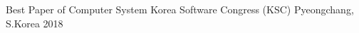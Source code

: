 




\begin{cvhonors}

  \cvhonor
    {Best Paper of Computer System} %
    {Korea Software Congress (KSC)} %
    {Pyeongchang, S.Korea} %
    {2018} %

\end{cvhonors}
